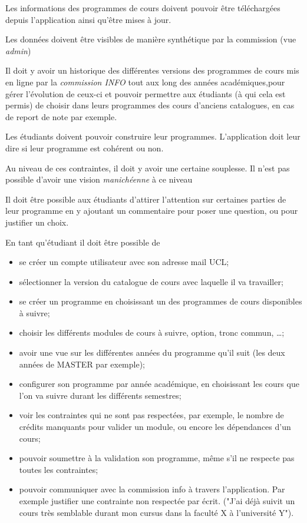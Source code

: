 Les informations des programmes de cours  doivent pouvoir être téléchargées depuis l'application ainsi qu'être mises à jour.

Les données doivent être visibles de manière synthétique par la commission (vue \textit{admin})

Il doit y avoir un historique des différentes versions des programmes de cours mis en ligne par la \textit{commission INFO} tout aux long des années académiques,pour gérer l'évolution de ceux-ci et pouvoir permettre aux étudiants (à qui cela est permis) de choisir dans leurs programmes des cours d'anciens catalogues, en cas de report de note par exemple.
 
Les étudiants doivent pouvoir construire leur programmes. L'application doit leur dire si leur programme est cohérent ou non.

Au niveau de ces contraintes, il doit y avoir une certaine souplesse. Il n'est pas possible d'avoir une vision \textit{manichéenne} à ce niveau

Il doit être possible aux étudiants d'attirer l'attention sur certaines parties de leur programme en y ajoutant un commentaire pour poser une question, ou pour justifier un choix.

En tant qu'étudiant il doit être possible de
\begin{itemize}
\item se créer un compte utilisateur avec son adresse mail UCL;
\item sélectionner la version du catalogue de cours avec laquelle il va travailler;
\item se créer un programme en choisissant un des programmes de cours disponibles à suivre;
\item choisir les différents modules de cours à suivre, option, tronc commun, \ldots ;
\item avoir une vue sur les différentes années du programme qu'il suit (les deux années de MASTER par exemple);
\item configurer son programme par année académique, en choisissant les cours que l'on va suivre durant les différents semestres;
\item voir les contraintes qui ne sont pas respectées, par exemple, le nombre de crédits manquants pour valider un module, ou encore les dépendances d'un cours;
\item pouvoir soumettre à la validation son programme, même s'il ne respecte pas toutes les contraintes;
\item pouvoir communiquer avec la commission info à travers l'application. Par exemple justifier une contrainte non respectée par écrit. ("J'ai déjà suivit un cours très semblable durant mon cursus dans la faculté X à l'université Y").  
\end{itemize}

